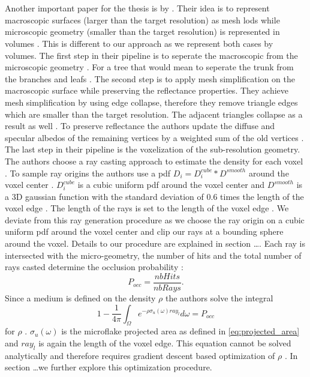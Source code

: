 \section{}
Another important paper for the thesis is  by \citeauthor{hybrid_mesh_volume_lods}.
Their idea is to represent macroscopic surfaces (larger than the target resolution) as mesh \acsp{lod} while microscopic geometry (smaller than the target resolution) is represented in volumes \cite[p. 3]{hybrid_mesh_volume_lods}.
This is different to our approach as we represent both cases by volumes.
The first step in their pipeline is to seperate the macroscopic from the microscopic geometry \cite[p. 5]{hybrid_mesh_volume_lods}.
For a tree that would mean to seperate the trunk from the branches and leafs \cite[p. 3]{hybrid_mesh_volume_lods}.
The second step is to apply mesh simplification on the macroscopic surface while preserving the reflectance properties.
They achieve mesh simplification by using edge collapse, therefore they remove triangle edges which are smaller than the target resolution.
The adjacent triangles collapse as a result as well \cite[p. 6]{hybrid_mesh_volume_lods}.
To preserve reflectance the authors update the diffuse and specular albedos of the remaining vertices by a weighted sum of the old vertices \cite[p. 6]{hybrid_mesh_volume_lods}.
The last step in their pipeline is the voxelization of the sub-resolution geometry.
The authors choose a ray casting approach to estimate the density for each voxel \cite[p. 8]{hybrid_mesh_volume_lods}.
To sample ray origins the authors use a \ac{pdf} $D_i=D_i^{cube} \ast D^{smooth}$ around the voxel center \cite[p. 9]{hybrid_mesh_volume_lods}.
$D_i^{cube}$ is a cubic uniform \ac{pdf} around the voxel center and $D^{smooth}$ is a 3D gaussian function with the standard deviation of 0.6 times the length of the voxel edge \cite[p. 9]{hybrid_mesh_volume_lods}.
The length of the rays is set to the length of the voxel edge \cite[p. 9]{hybrid_mesh_volume_lods}.
We deviate from this ray generation procedure as we choose the ray origin on a cubic uniform \ac{pdf} around the voxel center and clip our rays at a bounding sphere around the voxel.
Details to our procedure are explained in section \dots.
Each ray is intersected with the micro-geometry, the number of hits and the total number of rays casted determine the occlusion probability \cite[p. 8]{hybrid_mesh_volume_lods}:
\begin{equation}
    P_{occ}=\frac{nbHits}{nbRays}.
\end{equation}
Since a medium is defined on the density $\rho$ the authors solve the integral
\begin{equation}
    1 - \frac{1}{4\pi}\int_\Omega e^{-\rho\sigma_u(\omega)ray_l} d\omega = P_{occ}
\end{equation}
for $\rho$ \cite[p. 9]{hybrid_mesh_volume_lods}.
$\sigma_u(\omega)$ is the microflake projected area as defined in \ref{eq:projected_area} and $ray_l$ is again the length of the voxel edge.
This equation cannot be solved analytically and therefore requires gradient descent based optimization of $\rho$ \cite[p. 9]{hybrid_mesh_volume_lods}.
In section \dots we further explore this optimization procedure.


